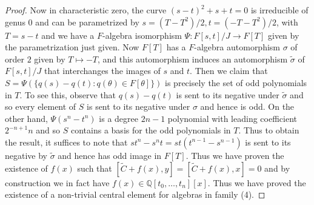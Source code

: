 \documentclass[a4paper,11pt,twoside,notitlepage,reqno]{amsart}
\theoremstyle{plain}
\numberwithin{thm}{section}
\theoremstyle{definition}
\begin{document}
\begin{proof}
Now in characteristic zero, the curve $(s-t)^2+s+t=0$ is irreducible of genus $0$ and can be parametrized by $s=(T-T^2)/2, t=(-T-T^2)/2$, with $T=s-t$ and we have a $F$-algebra isomorphism $\Psi: F[s,t]/J\to F[T]$ given by the parametrization just given. Now $F[T]$ has a $F$-algebra automorphism $\sigma$ of order $2$ given by $T\mapsto -T$, and this automorphism induces an automorphism $\tilde{\sigma}$ of $F[s,t]/J$ that interchanges the images of $s$ and $t$.  Then we claim that 
$S=\Psi(\{q(s)-q(t) \colon q(\theta)\in F[\theta]\})$ is precisely the set of odd polynomials in $T$.  To see this, observe that $q(s)-q(t)$ is sent to its negative under $\tilde{\sigma}$ and so every element of $S$ is sent to its negative under $\sigma$ and hence is odd. On the other hand, $\Psi(s^n-t^n)$ is a degree $2n-1$ polynomial with leading coefficient $2^{-n+1}n$ and so $S$ contains a basis for the odd polynomials in $T$.  Thus to obtain the result, it suffices to note that $st^n-s^n t = st (t^{n-1}-s^{n-1})$ is sent to its negative by $\tilde{\sigma}$ and hence has odd image in $F[T]$. Thus we have proven the existence of $f(x)$ such that $[\tilde{C}+f(x),y]=[\tilde{C}+f(x),x]=0$ and by construction we in fact have $f(x)\in \mathbb{Q}[t_0,\ldots ,t_n][x]$.  Thus we have proved the existence of a non-trivial central element for algebras in family (4).
\end{proof}
\end{document}

